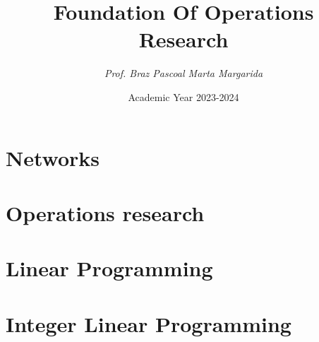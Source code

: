 \documentclass[12pt, a4paper]{report}
\title{\textbf{Foundation Of Operations Research}}
\author{\textit{Prof. Braz Pascoal Marta Margarida}}
\date{Academic Year 2023-2024}
\begin{document}
    \maketitle

    

    \cleardoublepage
    
    \tableofcontents

    \cleardoublepage
    
    \chapter{Networks}
    
    
    
    
    
       
    

    \chapter{Operations research}
    
    
    
    
    

    \chapter{Linear Programming}
    
    
    
    
    
    

    \chapter{Integer Linear Programming}
    
    
    
\end{document}
